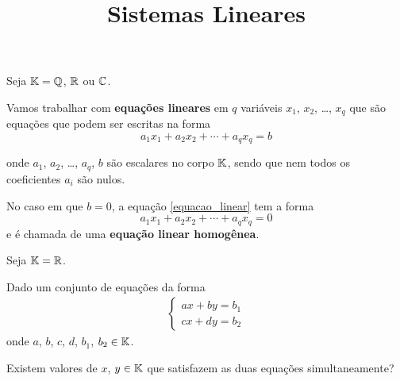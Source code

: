 \documentclass{beamer}
\title{Sistemas Lineares}
\author[\autor]{\autor}
\institute[\instituto]{\instituto}
\date{}
\begin{document}
    \begin{frame}
        \maketitle
    \end{frame}


    \begin{frame}
        Seja $\mathbb{K} = \mathbb{Q}$, $\mathbb{R}$ ou $\mathbb{C}$.

        \vspace{.3cm}

        Vamos trabalhar com \textbf{equações lineares} em $q$ variáveis $x_1$, $x_2$, \dots, $x_q$ que são equações que podem ser escritas na forma
        \begin{equation}\label{equacao_linear}
            a_1x_1 + a_2x_2 + \cdots + a_qx_q = b
        \end{equation}

        onde $a_1$, $a_2$, \dots, $a_q$, $b$ são escalares no corpo $\mathbb{K}$, sendo que nem todos os coeficientes $a_i$ são nulos.
        
        \vspace{.3cm}

        No caso em que $b = 0$, a equação \eqref{equacao_linear} tem a forma
        \begin{equation}
            a_1x_1 + a_2x_2 + \cdots + a_qx_q = 0
        \end{equation}
        e é chamada de uma \textbf{equação linear homogênea}.
        
    \end{frame}

    \begin{frame}
        Seja $\mathbb{K} = \mathbb{R}$.

        \vspace{.3cm}
        
        Dado um conjunto de equações da forma
        \begin{align}
            \begin{cases}\label{sistema_linear_2x2}
                ax + by = b_1\\
                cx + dy = b_2
            \end{cases}
        \end{align}
        onde $a$, $b$, $c$, $d$, $b_1$, $b_2 \in \mathbb{K}$.
    
        \vspace{.3cm}

        Existem valores de $x$, $y \in \mathbb{K}$ que satisfazem as duas equações simultaneamente?
    \end{frame}
\end{document}
